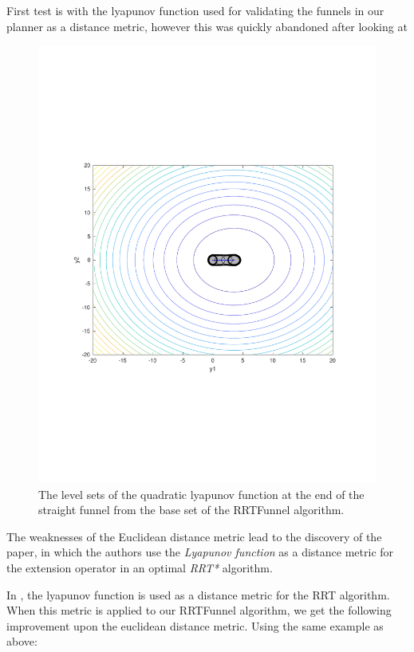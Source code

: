 First test is with the lyapunov function used for validating the funnels in our
planner as a distance metric, however this was quickly abandoned after looking
at
\begin{figure}
  \includegraphics[scale=.5]{figures/rrtfunnel/straight-funnel-lyapunov-level-sets}
  \caption{The level sets of the quadratic lyapunov function at the end of the
    straight funnel from the base set of the RRTFunnel algorithm.}
\end{figure}



The weaknesses of the Euclidean distance metric lead to the discovery of the
\cite{parkFeedbackMotionPlanning2015} paper, in which the authors use the
\textit{Lyapunov function} as a distance metric for the extension operator in an
optimal \textit{RRT*} algorithm.

In \cite{parkFeedbackMotionPlanning2015}, the lyapunov function is used as a
distance metric for the RRT algorithm. When this metric is applied to our
RRTFunnel algorithm, we get the following improvement upon the euclidean
distance metric. Using the same example as above:

